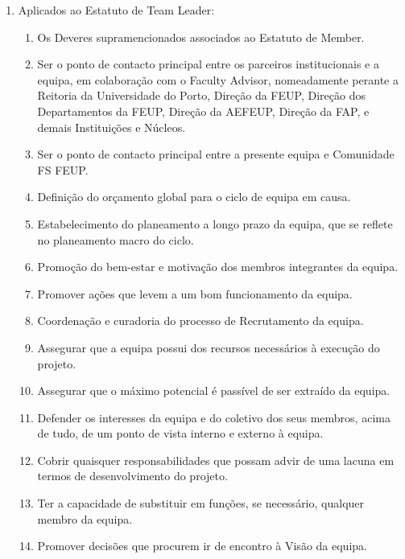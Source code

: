 \begin{enumerate}
\begin{enumerate}
    \item Aplicados ao Estatuto de Team Leader:
    \begin{enumerate}
      \item Os Deveres supramencionados associados ao Estatuto de Member.
      \item Ser o ponto de contacto principal entre os parceiros institucionais e a equipa, em colaboração com o Faculty Advisor, nomeadamente perante a Reitoria da Universidade do Porto, Direção da FEUP, Direção dos Departamentos da FEUP, Direção da AEFEUP, Direção da FAP, e demais Instituições e Núcleos.
      \item Ser o ponto de contacto principal entre a presente equipa e Comunidade FS FEUP.
      \item Definição do orçamento global para o ciclo de equipa em causa.
      \item Estabelecimento do planeamento a longo prazo da equipa, que se reflete no planeamento macro do ciclo.
      \item Promoção do bem-estar e motivação dos membros integrantes da equipa.
      \item Promover ações que levem a um bom funcionamento da equipa.
      \item Coordenação e curadoria do processo de Recrutamento da equipa.
      \item Assegurar que a equipa possui dos recursos necessários à execução do projeto.
      \item Assegurar que o máximo potencial é passível de ser extraído da equipa.
      \item Defender os interesses da equipa e do coletivo dos seus membros, acima de tudo, de um ponto de vista interno e externo à equipa.
      \item Cobrir quaisquer responsabilidades que possam advir de uma lacuna em termos de desenvolvimento do projeto.
      \item Ter a capacidade de substituir em funções, se necessário, qualquer membro da equipa.
      \item Promover decisões que procurem ir de encontro à Visão da equipa.
    \end{enumerate}
  \end{enumerate}
\end{enumerate}

